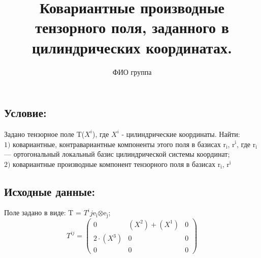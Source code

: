 \documentclass[a4paper, 12pt, oneside]{article}
\title{Ковариантные производные тензорного поля, заданного в цилиндрических координатах.}
\author{ФИО группа}
\begin{document}
\maketitle
\subsection*{Условие:}
Задано тензорное поле $\mathrm{T}$($X^i$), где $X^i$ - цилиндрические координаты. Найти:\\
$\mathrm{1)}$ ковариантные, контравариантные компоненты этого поля в базисах $\mathrm{r_i}$, $\mathrm{r^i}$,
где $\mathrm{r_i}$ — ортогональный локальный базис цилиндрической системы координат;\\
$\mathrm{2)}$ ковариантные производные компонент тензорного поля в базисах $\mathrm{r_i}$, $\mathrm{r^i}$\\
\subsection*{Исходные данные:}
Поле задано в виде: $\mathrm{T}$ = $T^ij$$\mathrm{e_i}$$\otimes$$\mathrm{e_j}$;\\

\[
T^{ij}=\begin{pmatrix}
	0 & (X^2) + (X^1) & 0\\
	2\cdot (X^3) & 0 & 0\\
	0 & 0 & 0
\end{pmatrix}
\]
\end{document}
